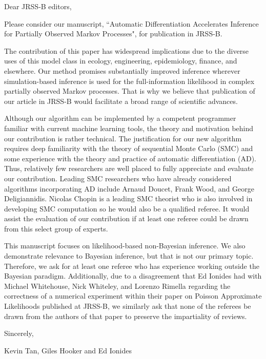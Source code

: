 \documentclass[11pt]{article}
\begin{document}
\noindent Dear JRSS-B editors,
\newline

Please consider our manuscript, ``Automatic Differentiation Accelerates Inference for Partially Observed Markov Processes", for publication in JRSS-B.

The contribution of this paper has widespread implications due to the diverse uses of this model class in ecology, engineering, epidemiology, finance, and elsewhere. Our method promises substantially improved inference wherever simulation-based inference is used for the full-information likelihood in complex partially observed Markov processes. That is why we believe that publication of our article in JRSS-B would facilitate a broad range of scientific advances. 

Although our algorithm can be implemented by a competent programmer familiar with current machine learning tools, the theory and motivation behind our contribution is rather technical. The justification for our new algorithm requires deep familiarity with the theory of sequential Monte Carlo (SMC) and some experience with the theory and practice of automatic differentiation (AD). Thus, relatively few researchers are well placed to fully appreciate and evaluate our contribution. Leading SMC researchers who have already considered algorithms incorporating AD include Arnaud Doucet, Frank Wood, and George Deligiannidis. Nicolas Chopin is a leading SMC theorist who is also involved in developing SMC computation so he would also be a qualified referee. It would assist the evaluation of our contribution if at least one referee could be drawn from this select group of experts.

This manuscript focuses on likelihood-based non-Bayesian inference. We also demonstrate relevance to Bayesian inference, but that is not our primary topic. Therefore, we ask for at least one referee who has experience working outside the Bayesian paradigm. Additionally, due to a disagreement that Ed Ionides had with Michael Whitehouse, Nick Whiteley, and Lorenzo Rimella regarding the correctness of a numerical experiment within their paper on Poisson Approximate Likelihoods published at JRSS-B, we similarly ask that none of the referees be drawn from the authors of that paper to preserve the impartiality of reviews.
\vspace{3ex}

\noindent Sincerely,

\noindent Kevin Tan, Giles Hooker and Ed Ionides
\end{document}
